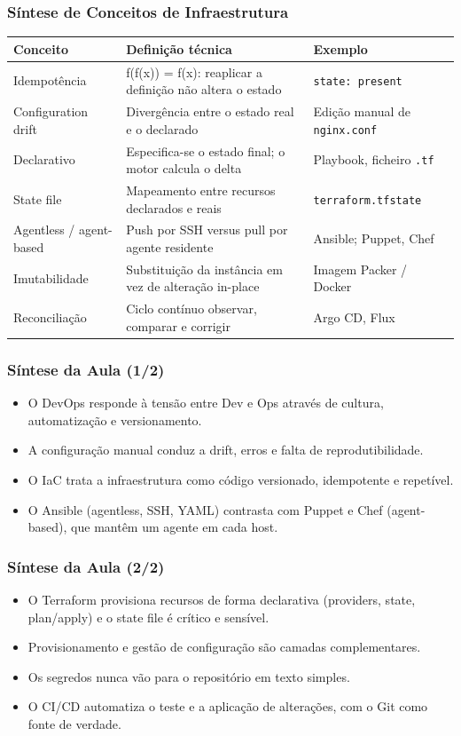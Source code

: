 \documentclass[aspectratio=169]{beamer}
\begin{document}
\begin{frame}
\frametitle{Síntese de Conceitos de Infraestrutura}
\scriptsize
\renewcommand{\arraystretch}{1.2}
\begin{tabular}{L{2.6cm}L{5.6cm}L{3.6cm}}
\textbf{Conceito} & \textbf{Definição técnica} & \textbf{Exemplo} \\
\hline
Idempotência & f(f(x)) = f(x): reaplicar a definição não altera o estado & \texttt{state: present} \\
Configuration drift & Divergência entre o estado real e o declarado & Edição manual de \texttt{nginx.conf} \\
Declarativo & Especifica-se o estado final; o motor calcula o delta & Playbook, ficheiro \texttt{.tf} \\
State file & Mapeamento entre recursos declarados e reais & \texttt{terraform.tfstate} \\
Agentless / agent-based & Push por SSH versus pull por agente residente & Ansible; Puppet, Chef \\
Imutabilidade & Substituição da instância em vez de alteração in-place & Imagem Packer / Docker \\
Reconciliação & Ciclo contínuo observar, comparar e corrigir & Argo CD, Flux \\
\end{tabular}
\end{frame}

\begin{frame}
\frametitle{Síntese da Aula \textcolor{NudeTaupe}{\small(1/2)}}
\begin{itemize}
    \setlength\itemsep{0.4cm}
    \item O DevOps responde à tensão entre Dev e Ops através de cultura, automatização e versionamento.
    \item A configuração manual conduz a drift, erros e falta de reprodutibilidade.
    \item O IaC trata a infraestrutura como código versionado, idempotente e repetível.
    \item O Ansible (agentless, SSH, YAML) contrasta com Puppet e Chef (agent-based), que mantêm um agente em cada host.
\end{itemize}
\end{frame}

\begin{frame}
\frametitle{Síntese da Aula \textcolor{NudeTaupe}{\small(2/2)}}
\begin{itemize}
    \setlength\itemsep{0.4cm}
    \item O Terraform provisiona recursos de forma declarativa (providers, state, plan/apply) e o state file é crítico e sensível.
    \item Provisionamento e gestão de configuração são camadas complementares.
    \item Os segredos nunca vão para o repositório em texto simples.
    \item O CI/CD automatiza o teste e a aplicação de alterações, com o Git como fonte de verdade.
\end{itemize}
\end{frame}
\end{document}
